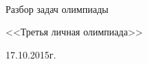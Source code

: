\begin{titlepage}
\newpage
{}
~\vspace{5cm}

\Large{Разбор задач олимпиады}

\Large{<<Третья личная олимпиада>>}

\Large{17.10.2015г.}

\end{titlepage}
